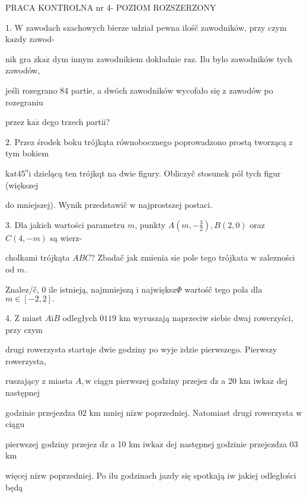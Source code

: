 \documentclass[a4paper,12pt]{article}
\begin{document}
PRACA KONTROLNA nr 4- POZIOM ROZSZERZONY

1. $\mathrm{W}$ zawodach szachowych bierze udział pewna ilośč zawodników, przy czym $\mathrm{k}\mathrm{a}\dot{\mathrm{z}}\mathrm{d}\mathrm{y}$ zawod-

nik gra $\mathrm{z}\mathrm{k}\mathrm{a}\dot{\mathrm{z}}$ dym innym zawodnikiem dokładnie $\mathrm{r}\mathrm{a}\mathrm{z}$. Ilu bylo zawodników tych zawodów,

jeśli rozegrano 84 partie, a dwóch zawodników wycofało się $\mathrm{z}$ zawodów po rozegraniu

przez $\mathrm{k}\mathrm{a}\dot{\mathrm{z}}$ dego trzech partii?

2. Przez środek boku trójkąta równobocznego poprowadzono prostą tworzącą $\mathrm{z}$ tym bokiem

$\mathrm{k}\mathrm{a}\mathrm{t}45^{\mathrm{o}}\mathrm{i}$ dzielącą ten trójkqt na dwie figury. Obliczyč stosunek pól tych figur (większej

do mniejszej). Wynik przedstawič $\mathrm{w}$ najprostszej postaci.

3. Dla jakich wartości parametru $m$, punkty $A(m,-\displaystyle \frac{3}{2}), B(2,0)$ oraz $C(4,-m)$ są wierz-

cholkami trójkąta $ABC$? Zbadač jak zmienia $\mathrm{s}\mathrm{i}\mathrm{e}$ pole tego trójkata $\mathrm{w}$ zalezności od $m.$

Znalez/č, $0$ ile istnieją, najmniejszą $\mathrm{i}$ największ$\Phi$ wartośč tego pola dla $m\in[-2,2].$

4. $\mathrm{Z}$ miast $A\mathrm{i}B$ odległych $0119$ km wyruszają naprzeciw siebie dwaj rowerzyści, przy czym

drugi rowerzysta startuje dwie godziny po wyje $\acute{\mathrm{z}}\mathrm{d}\mathrm{z}\mathrm{i}\mathrm{e}$ pierwszego. Pierwszy rowerzysta,

ruszający $\mathrm{z}$ miasta $A, \mathrm{w}$ ciągu pierwszej godziny przejez $\mathrm{d}\dot{\mathrm{z}}$ a 20 km $\mathrm{i}\mathrm{w}\mathrm{k}\mathrm{a}\dot{\mathrm{z}}$ dej następnej

godzinie przejezdza $02$ km mniej $\mathrm{n}\mathrm{i}\dot{\mathrm{z}}\mathrm{w}$ poprzedniej. Natomiast drugi rowerzysta $\mathrm{w}$ ciągu

pierwszej godziny przejez $\mathrm{d}\dot{\mathrm{z}}$ a 10 km $\mathrm{i}\mathrm{w}\mathrm{k}\mathrm{a}\dot{\mathrm{z}}$ dej następnej godzinie przejezdza $03$ km

więcej $\mathrm{n}\mathrm{i}\dot{\mathrm{z}}\mathrm{w}$ poprzedniej. Po ilu godzinach jazdy się spotkają $\mathrm{i}\mathrm{w}$ jakiej odległości będą
\end{document}
